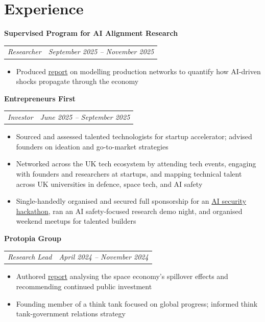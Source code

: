 \documentclass[legalpaper,11pt]{article}
\makeatletter
\newcommand{\resumeSection}[1]{
    \vspace{-9pt}
    \section{#1}
}
\newcommand{\resumeItem}[1]{
  \item\small{#1}
  \vspace{-3pt}
}
\newcommand{\resumeSubheading}[1]{
  \textbf{#1}\\
  \vspace{-1pt}
}
\newcommand{\jobtitleanddate}[2]{
  \begin{tabular*}{0.97\textwidth}{l@{\extracolsep{\fill}}r}
    \textit{\small#1} & \textit{\small#2} \\
  \end{tabular*}\vspace{-4pt}
}
\newcommand{\resumeItemListStart}{\begin{itemize}}
\newcommand{\resumeItemListEnd}{\end{itemize}}
\makeatother
\begin{document}

\resumeSection{Experience}

    \resumeSubheading{Supervised Program for AI Alignment Research}
    \jobtitleanddate{Researcher}{September 2025 -- November 2025}
    \resumeItemListStart
        \resumeItem{Produced \href{https://drive.google.com/file/d/1uoFprIvA7l3HcdSNJSE-ZR7_vi_luCEu/view?usp=sharing}{report} on modelling production networks to quantify how AI-driven shocks propagate through the economy}
    \resumeItemListEnd
    
    \resumeSubheading{Entrepreneurs First}
    \jobtitleanddate{Investor}{June 2025 -- September 2025}
    \resumeItemListStart
        \resumeItem{Sourced and assessed talented technologists for startup accelerator; advised founders on ideation and go-to-market strategies}
        \resumeItem{Networked across the UK tech ecosystem by attending tech events, 
        engaging with founders and researchers at startups,
        and mapping technical talent across UK universities in defence, space tech, and AI safety}
        \resumeItem{Single-handedly organised and secured full sponsorship for an
        \href{https://www.linkedin.com/posts/yuvraj-k_pushing-the-frontier-of-ai-security-activity-7370781173230350337-Bbpl/}{AI security hackathon},
        ran an AI safety-focused research demo night, and organised weekend meetups for talented builders}
    \resumeItemListEnd

    \resumeSubheading{Protopia Group}
    \jobtitleanddate{Research Lead}{April 2024 -- November 2024}
      \resumeItemListStart
        \resumeItem{Authored \href{https://joshuamuthu.substack.com/p/to-boldly-grow}{report} analysing the space economy's spillover effects and recommending continued public investment}
        \resumeItem{Founding member of a think tank focused on global progress; informed think tank-government relations strategy}
      \resumeItemListEnd
\end{document}
